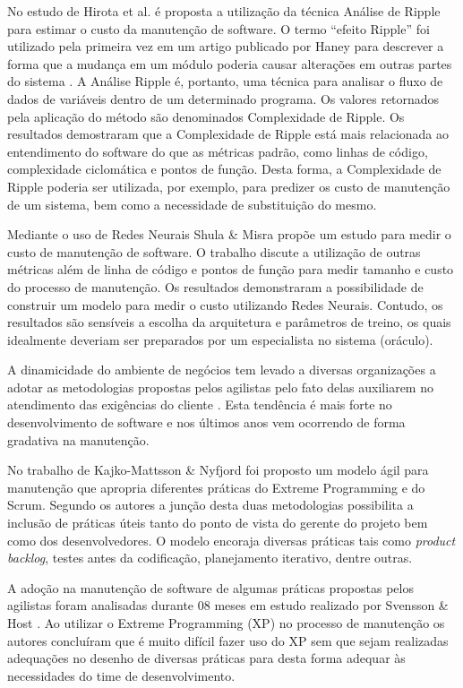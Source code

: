 \documentclass[msc]{ppgccufmg} %
\begin{document}
No estudo de Hirota et al. \cite{hirota1994approach} é proposta a utilização da técnica Análise de Ripple para estimar o custo da manutenção de software. O termo ``efeito Ripple'' foi utilizado pela primeira vez em um artigo publicado por Haney \cite{haney1972module} para descrever a forma que a mudança em um módulo poderia causar alterações em outras partes do sistema \cite{bilal2005using}. A Análise Ripple é, portanto, uma técnica para analisar o fluxo de dados de variáveis dentro de um determinado programa. Os valores retornados pela aplicação do método são denominados Complexidade de Ripple. Os resultados demostraram que a Complexidade de Ripple está mais relacionada ao entendimento do
software do que as métricas padrão, como linhas de código, complexidade ciclomática e pontos de função. Desta forma, a Complexidade de Ripple poderia ser utilizada, por exemplo, para predizer os custo de manutenção de um sistema, bem como a necessidade de substituição do mesmo.

Mediante o uso de Redes Neurais Shula \& Misra
\cite{Shukla:2008:ESM:1342211.1342232} propõe um estudo para medir o custo de
manutenção de software. O trabalho discute a utilização de outras métricas além
de linha de código e pontos de função para medir  tamanho e custo do processo de manutenção. Os resultados demonstraram a possibilidade de construir um modelo para medir o custo utilizando Redes Neurais. Contudo, os resultados são sensíveis a escolha da arquitetura e parâmetros de treino, os quais idealmente deveriam ser preparados por um especialista no sistema (oráculo).


A dinamicidade do ambiente de negócios tem levado a diversas organizações a adotar as metodologias propostas pelos agilistas pelo fato delas auxiliarem no atendimento das exigências do cliente \cite{Devulapally2015}. Esta tendência é mais forte no desenvolvimento de software e nos últimos anos vem ocorrendo de forma gradativa na manutenção. 

No trabalho de Kajko-Mattsson \& Nyfjord \cite{4755767} foi proposto um modelo ágil para manutenção que apropria diferentes práticas do Extreme Programming e do Scrum. Segundo os autores a junção desta duas metodologias possibilita a inclusão de práticas úteis tanto do ponto de vista do gerente do projeto bem como dos desenvolvedores. O modelo encoraja diversas práticas tais como \textit{product backlog}, testes antes da codificação, planejamento iterativo, dentre outras.

A adoção na manutenção de software de algumas práticas propostas pelos agilistas foram analisadas durante 08 meses em estudo realizado por Svensson \& Host \cite{1402140}. Ao utilizar o Extreme Programming (XP) no processo de manutenção os autores concluíram que é muito difícil fazer uso do XP sem que sejam realizadas adequações no desenho de diversas práticas para desta forma adequar às necessidades do time de desenvolvimento.
\end{document}
